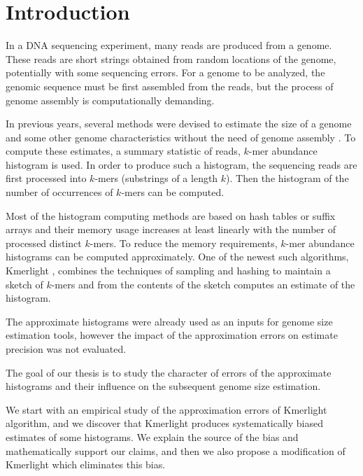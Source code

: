 \chapter*{Introduction}

In a DNA sequencing experiment, many reads are produced from a genome.
These reads are short strings obtained from random locations of the genome,
potentially with some sequencing errors.
For a genome to be analyzed, the genomic sequence must be first assembled from the reads,
but the process of genome assembly is computationally demanding.

In previous years, several methods were devised to estimate
the size of a genome and some other genome characteristics
without the need of genome assembly \cite{Hozza2015, Williams2013, Melsted2014,
Sivadasan2016}. To compute these estimates,
a summary statistic of reads, $k$-mer abundance histogram is used.
In order to produce such a histogram, the sequencing reads are first processed into $k$-mers 
(substrings of a length $k$). Then the histogram of the number of occurrences of $k$-mers
can be computed. 

Most of the histogram computing methods are based on hash tables or suffix arrays 
\cite{Melsted2011, Marcais2011, Rizk2013, Kurtz2008} and
their memory usage increases at least linearly with the number of processed distinct $k$-mers. 
To reduce the memory requirements, $k$-mer abundance histograms can be computed approximately.
One of the newest such algorithms, Kmerlight \cite{Sivadasan2016}, combines the
techniques of sampling and hashing to maintain a sketch of $k$-mers 
and from the contents of the sketch computes an estimate of the histogram.

The approximate histograms were already used as an inputs for genome size estimation tools,
however the impact of the approximation errors on estimate precision was not evaluated.

\medskip

The goal of our thesis is to study the character of errors of the approximate histograms
and their influence on the subsequent genome size estimation.

We start with an empirical study of the approximation errors of Kmerlight algorithm, and
we discover that Kmerlight produces systematically biased estimates of some histograms.
We explain the source of the bias and mathematically support our claims, and then
we also propose a modification of Kmerlight which eliminates this bias.

